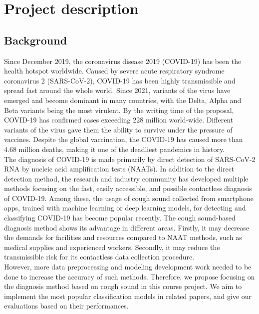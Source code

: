 \documentclass[11pt]{article}
\begin{document}
\section{Project description} %
\subsection{Background}
Since December 2019, the coronavirus disease 2019 (COVID-19) has been the health hotspot 
worldwide. Caused by severe acute respiratory syndrome coronavirus 2 (SARS-CoV-2), COVID-19
 has been highly transmissible and spread fast around the whole world. Since 2021, variants 
 of the virus have emerged and become dominant in many countries, with the Delta, Alpha and 
 Beta variants being the most virulent. By the writing time of the proposal, COVID-19 has
  confirmed cases exceeding 228 million world-wide\cite{enwiki:1044966507}. Different variants of the virus gave 
  them the ability to survive under the pressure of vaccines. Despite the global vaccination,
   the COVID-19 has caused more than  4.68 million deaths, making it one of the deadliest 
   pandemics in history.\\

\noindent
The diagnosis of COVID-19 is made primarily by direct detection of SARS-CoV-2 RNA by nucleic acid amplification tests (NAATs). In addition to the direct detection method, the research and industry community has developed multiple methods focusing on the fast, easily accessible, and possible contactless diagnosis of COVID-19. Among these, the usage of cough sound collected from smartphone apps, trained with machine learning or deep learning models, for detecting and classifying COVID-19 has become popular recently\cite{PPR:PPR343330}. The cough sound-based 
diagnosis method shows its advantage in different areas. Firstly, it may decrease the demands for facilities and resources compared to NAAT methods, such as medical supplies and experienced workers. Secondly, it may reduce the transmissible risk for its contactless data collection procedure. \\

\noindent
However, more data preprocessing and modeling development work needed to be done to increase the accuracy of such methods. Therefore, we propose focusing on the diagnosis method based on cough sound in this course project. We aim to implement the most popular classification 
models in related papers, and give our evaluations based on their performances. 
\end{document}
